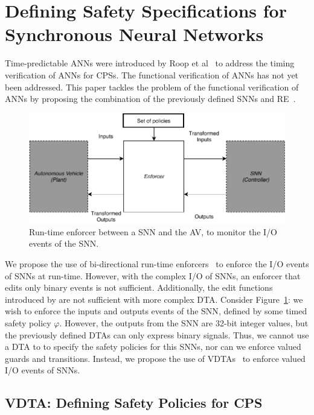 \section{Defining Safety Specifications for Synchronous Neural Networks}
\label{sec:definitions}

Time-predictable \acp{ANN} were introduced by Roop et al~\cite{sann} to address the timing verification of \acp{ANN} for \acp{CPS}.
The functional verification of \acp{ANN} has not yet been addressed.
This paper tackles the problem of the functional verification of \acp{ANN} by proposing the combination of the previously defined \acp{SNN} and \acf{RE}~\cite{recps}.

\begin{figure}[h]
	\centering
	\includegraphics[width=0.8\linewidth]{Content/fig/RE.pdf}
	\caption{Run-time enforcer between a \ac{SNN} and the \acf{AV}, to monitor the I/O events of the \ac{SNN}. \label{fig:re}}
\end{figure} 

We propose the use of bi-directional run-time enforcers~\cite{recps} to enforce the I/O events of \acp{SNN} at run-time.
However, with the complex I/O of \acp{SNN}, an enforcer that edits only binary events is not sufficient.
Additionally, the edit functions introduced by \cite{recps} are not sufficient with more complex \ac{DTA}.
Consider Figure~\ref{fig:re}: we wish to enforce the inputs and outputs events of the \ac{SNN}, defined by some timed safety policy $\varphi$.
However, the outputs from the \ac{SNN} are 32-bit integer values, but the previously defined \acp{DTA} can only express binary signals.
Thus, we cannot use a \ac{DTA} to to specify the safety policies for this \acp{SNN}, nor can we enforce valued guards and transitions.
Instead, we propose the use of \acfp{VDTA}~\cite{rv-snn} to enforce valued I/O events of \acp{SNN}.

\subsection{\acf{VDTA}: Defining Safety Policies for \ac{CPS}}


